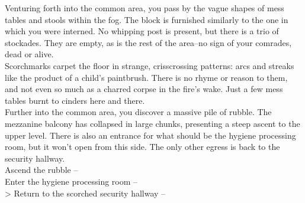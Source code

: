 Venturing forth into the common area, you pass by the vague shapes of mess tables and stools within the fog. The block is furnished similarly to the one in which you were interned. No whipping post is present, but there is a trio of stockades. They are empty, as is the rest of the area--no sign of your comrades, dead or alive.\\

Scorchmarks carpet the floor in strange, crisscrossing patterns: arcs and streaks like the product of a child’s paintbrush. There is no rhyme or reason to them, and not even so much as a charred corpse in the fire’s wake. Just a few mess tables burnt to cinders here and there.\\

Further into the common area, you discover a massive pile of rubble. The mezzanine balcony has collapsed in large chunks, presenting a steep ascent to the upper level. There is also an entrance for what should be the hygiene processing room, but it won’t open from this side. The only other egress is back to the security hallway.\\

 Ascend the rubble -- \\
 Enter the hygiene processing room -- \\
> Return to the scorched security hallway -- 